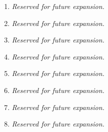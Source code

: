 \documentclass{article}
\begin{document}
\begin{itemize}
\begin{enumerate}
			\item \textit{Reserved for future expansion.}
			\item \textit{Reserved for future expansion.}
			\item \textit{Reserved for future expansion.}
			\item \textit{Reserved for future expansion.}

			\item \textit{Reserved for future expansion.}
			\item \textit{Reserved for future expansion.}
			\item \textit{Reserved for future expansion.}
			\item \textit{Reserved for future expansion.}
			\end{enumerate}
		\end{itemize}
		\newpage
\end{document}
